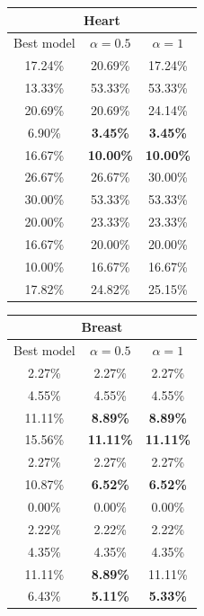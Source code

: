 \documentclass[a4paper,12pt ]{report}
\begin{document}
\begin{table}[h]


\begin{minipage}{0.55\textwidth}
      \centering
           \begin{tabular}{|c | c | c | }
      \hline
      \multicolumn{3}{|c|}{Heart}  \\
      \hline
      Best model & $ \alpha = 0.5 $ & $ \alpha = 1 $ \\  \hline
	17.24\% & 	20.69\% & 	17.24\% \\ 
	13.33\% & 	53.33\% & 	53.33\% \\ 
	20.69\% & 	20.69\% & 	24.14\% \\ 
	6.90\% & 	\textbf{3.45\% } &   \textbf{3.45\%}  \\ 
	16.67\% & 	\textbf{10.00\%}  & 	\textbf{10.00\%} \\ 
	26.67\% & 	26.67\% & 	30.00\% \\ 
	30.00\% & 	53.33\% & 	53.33\% \\ 
	20.00\% & 	23.33\% & 	23.33\% \\ 
	16.67\% & 	20.00\% & 	20.00\% \\ 
	10.00\% & 	16.67\% & 	16.67\% \\ \hline \hline
	 17.82\% & 	 24.82\% & 	 25.15\% \\
  
      \hline 
      \end{tabular}

\end{minipage}%
\begin{minipage}{0.55\textwidth}
      \centering
           \begin{tabular}{|c | c | c | }
      \hline
      \multicolumn{3}{|c|}{Breast}  \\
      \hline
      Best model & $ \alpha = 0.5 $ & $ \alpha = 1 $ \\  \hline
2.27\% & 	2.27\% & 	2.27\% \\
4.55\% & 	4.55\% & 	4.55\% \\
11.11\% & 	\textbf{8.89\% } & 	\textbf{8.89\%} \\ 
15.56\% & 	\textbf{11.11\% } & 	\textbf{11.11\%} \\ 
2.27\% & 	2.27\% & 	2.27\% \\ 
10.87\% & 	\textbf{6.52\% } & 	\textbf{6.52\%} \\ 
0.00\% & 	0.00\% & 	0.00\% \\ 
2.22\% & 	2.22\% & 	2.22\% \\ 
4.35\% & 	4.35\% & 	4.35\% \\ 
11.11\% & 	\textbf{8.89\%} & 	11.11\% \\  \hline  \hline
 6.43\%	&  \textbf{5.11\%}	&  \textbf{5.33\%} \\
       \hline 
 
 \end{tabular}

\end{minipage}%



\end{table}
\end{document}
